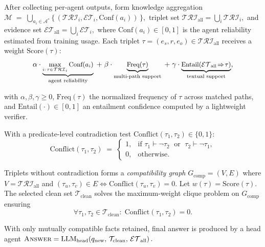 \documentclass[sigconf]{acmart}
\begin{document}
After collecting per-agent outputs, form knowledge aggregation
$
\mathcal{M}
\;=\;
\bigcup_{a_i \in \mathcal{A}^*} \bigl\{\,(\mathcal{TRI}_i,\mathcal{ET}_i, \text{Conf}(a_i))\,\bigr\},
$ triplet set
$
\mathcal{TRI}_{\text{all}}=\bigcup_i \mathcal{TRI}_i,
$ and evidence set
$
\mathcal{ET}_{\text{all}}=\bigcup_i \mathcal{ET}_i,
$
where \(\text{Conf}(a_i)\in[0,1]\) is the agent reliability estimated from training usage.
Each triplet \(\tau=(e_s,r,e_o)\in \mathcal{TRI}_{\text{all}}\) receives a weight  $\text{Score}(\tau)$:
\begin{equation}
\small
\label{eq:triplet-score}
\alpha \cdot \underbrace{\max_{i:\,\tau\in \mathcal{TRI}_i}\text{Conf}(a_i)}_{\text{agent reliability}}
\;+\;
\beta \cdot \underbrace{\text{Freq}(\tau)}_{\text{multi-path support}}
\;+\;
\gamma \cdot \underbrace{\text{Entail}(\mathcal{ET}_{\text{all}}\!\Rightarrow\!\tau)}_{\text{textual support}},
\end{equation}

with \(\alpha,\beta,\gamma \ge 0\), \(\text{Freq}(\tau)\) the normalized frequency of \(\tau\) across matched paths,
and \(\text{Entail}(\cdot)\in[0,1]\) an entailment confidence computed by a lightweight verifier.

With a predicate-level contradiction test \(\text{Conflict}(\tau_1,\tau_2)\in\{0,1\}\):
\begin{equation}
\label{eq:conflict}
\text{Conflict}(\tau_1,\tau_2)
\;=\;
\begin{cases}
1, & \text{if } \tau_1 \vdash \neg \tau_2 \;\text{ or }\; \tau_2 \vdash \neg \tau_1,\\
0, & \text{otherwise.}
\end{cases}
\end{equation}

Triplets without contradiction forms a \emph{compatibility graph} \(G_{\text{comp}}=(V,E)\) where
\(V=\mathcal{TRI}_{\text{all}}\) and
\((\tau_u,\tau_v)\in E \iff \text{Conflict}(\tau_u,\tau_v)=0\).
Let \(w(\tau)=\text{Score}(\tau)\).
The selected clean set \(\mathcal{T}_{\text{clean}}\) solves the maximum-weight clique problem on \(G_{\text{comp}}\) ensuring
\[
\forall \tau_1,\tau_2 \in \mathcal{T}_{\text{clean}}:\; \text{Conflict}(\tau_1,\tau_2)=0.
\]

With only mutually compatible facts retained, final answer is produced by a head agent $
\textsc{Answer}
=
\text{LLM}_{\text{head}}\!\left(q_{\text{new}},\, \mathcal{T}_{\text{clean}},\, \mathcal{ET}_{\text{all}}\right).
$


\end{document}
